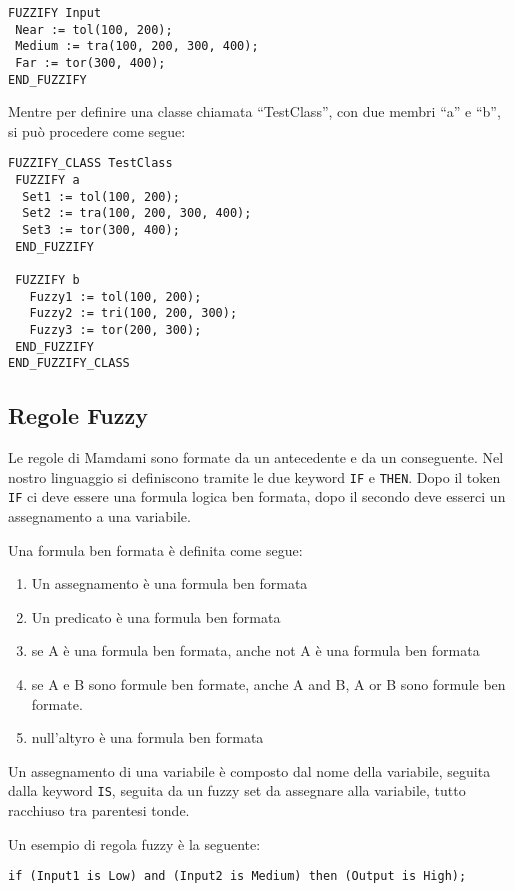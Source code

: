 \begin{verbatim}
FUZZIFY Input
 Near := tol(100, 200);
 Medium := tra(100, 200, 300, 400);
 Far := tor(300, 400);
END_FUZZIFY
\end{verbatim}

Mentre per definire una classe chiamata ``TestClass'', con due membri ``a'' e ``b'', si può procedere come segue:

\begin{verbatim}
FUZZIFY_CLASS TestClass
 FUZZIFY a
  Set1 := tol(100, 200);
  Set2 := tra(100, 200, 300, 400);
  Set3 := tor(300, 400);
 END_FUZZIFY
 
 FUZZIFY b
   Fuzzy1 := tol(100, 200);
   Fuzzy2 := tri(100, 200, 300);
   Fuzzy3 := tor(200, 300);
 END_FUZZIFY
END_FUZZIFY_CLASS
\end{verbatim}


\subsection{Regole Fuzzy}
Le regole di Mamdami sono formate da un antecedente e da un conseguente. Nel nostro linguaggio si definiscono tramite le due keyword \verb|IF| e \verb|THEN|.
Dopo il token \verb|IF| ci deve essere una formula logica ben formata, dopo il secondo deve esserci un assegnamento a una variabile.

Una formula ben formata è definita come segue:
\begin{enumerate}
 \item Un assegnamento è una formula ben formata
 \item Un predicato è una formula ben formata
 \item se A è una formula ben formata, anche not A è una formula ben formata
 \item se A e B sono formule ben formate, anche A and B, A or B sono formule ben formate.
 \item null'altyro è una formula ben formata
\end{enumerate}

Un assegnamento di una variabile è composto dal nome della variabile, seguita dalla keyword \verb|IS|, seguita da un fuzzy set da assegnare alla variabile, tutto racchiuso tra parentesi tonde.

Un esempio di regola fuzzy è la seguente:

\begin{verbatim}
if (Input1 is Low) and (Input2 is Medium) then (Output is High); 
\end{verbatim}



